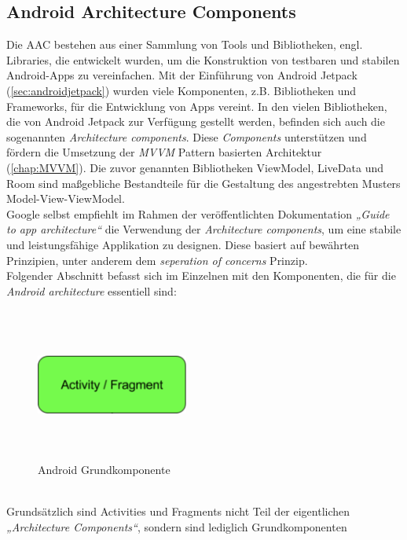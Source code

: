 \subsection{Android Architecture Components}
\label{chap:AAC}
Die \ac{AAC} bestehen aus einer Sammlung von Tools und Bibliotheken, engl. Libraries, die entwickelt wurden, um die 
Konstruktion von testbaren und stabilen Android-Apps zu vereinfachen. Mit der Einführung von Android Jetpack (\ref{sec:androidjetpack}) wurden 
viele Komponenten, z.B. Bibliotheken und Frameworks, für die Entwicklung von Apps vereint. In den vielen Bibliotheken, die von Android Jetpack 
zur Verfügung gestellt werden, befinden sich auch die sogenannten \textit{Architecture components}. Diese \textit{Components} unterstützen und 
fördern die Umsetzung der \textit{MVVM} Pattern basierten Architektur (\ref{chap:MVVM}). Die zuvor genannten Bibliotheken ViewModel, LiveData und Room 
sind maßgebliche Bestandteile für die Gestaltung des angestrebten Musters Model-View-ViewModel. 
\\ 
Google selbst empfiehlt im Rahmen der veröffentlichten Dokumentation \textit{„Guide to app architecture“} die Verwendung der \textit{Architecture components}, um 
eine stabile und leistungsfähige Applikation zu designen. Diese basiert auf bewährten Prinzipien, unter anderem dem \textit{seperation of concerns} Prinzip.
\\ 
\linebreak
Folgender Abschnitt befasst sich im Einzelnen mit den Komponenten, die für die \textit{Android architecture} essentiell sind:
\begin{figure}[hbt!]
    \centering
    \includegraphics[width=5cm,height=5cm,keepaspectratio]{2GrundlagenX/Bilder/activityComp.png}
    \caption{Android Grundkomponente \cite{aac.2020j}}
    \label{pic:activity}
\end{figure}
\\
Grundsätzlich sind Activities und Fragments nicht Teil der eigentlichen \textit{„Architecture Components“}, sondern sind lediglich Grundkomponenten 
